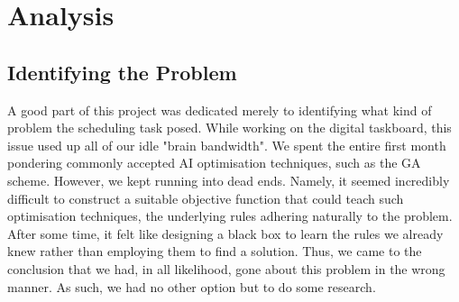 \section{Analysis}
\subsection{Identifying the Problem}
A good part of this project was dedicated merely to identifying what kind of problem the scheduling task posed. While working on the digital taskboard, this issue used up all of our idle "brain bandwidth". We spent the entire first month pondering commonly accepted AI optimisation techniques, such as the GA scheme. However, we kept running into dead ends. Namely, it seemed incredibly difficult to construct a suitable objective function that could teach such optimisation techniques, the underlying rules adhering naturally to the problem. After some time, it felt like designing a black box to learn the rules we already knew rather than employing them to find a solution. Thus, we came to the conclusion that we had, in all likelihood, gone about this problem in the wrong manner. As such, we had no other option but to do some research.

